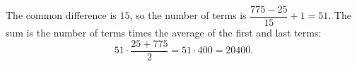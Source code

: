 The common difference is $15$, so the number of terms is $\dfrac{775-25}{15}+1=51$. The sum is the number of terms times the average of the first and last terms:
\[51\cdot\dfrac{25+775}{2}=51\cdot400=\boxed{20400}.\]

